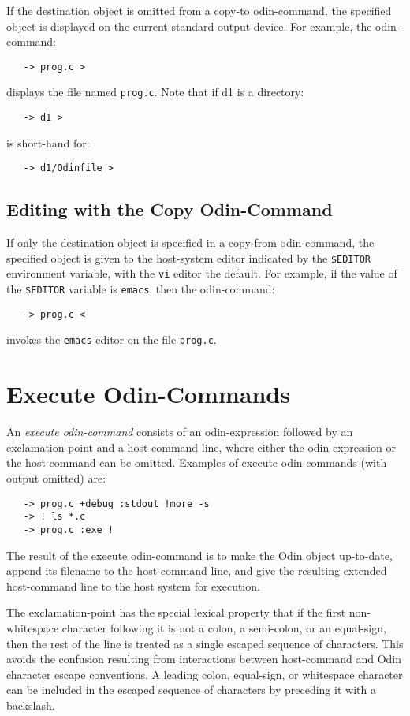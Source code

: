 \documentclass[hidelinks]{report}
\newcommand{\ex}{\tt}   %
\begin{document}
If the destination object is omitted from a copy-to odin-command,
the specified object is displayed on the current standard output device.
For example, the odin-command:
\begin{verbatim}
   -> prog.c >
\end{verbatim}
displays the file named {\ex prog.c}. Note that if d1 is a directory:
\begin{verbatim}
   -> d1 >
\end{verbatim}
is short-hand for:
\begin{verbatim}
   -> d1/Odinfile >
\end{verbatim}

\subsection{Editing with the Copy Odin-Command}

If only the destination object is specified in a copy-from odin-command,
the specified object is given to the host-system editor
indicated by the {\ex \$EDITOR} environment variable,
with the {\ex vi} editor the default.
For example, if the value of the {\ex \$EDITOR} variable is {\ex emacs},
then the odin-command:
\begin{verbatim}
   -> prog.c <
\end{verbatim}
invokes the {\ex emacs} editor on the file {\ex prog.c}.


\section{Execute Odin-Commands}
\label{execute}

An {\em execute odin-command} consists of an odin-expression followed by
an exclamation-point and a host-command line,
where either the odin-expression or the host-command can be omitted.
Examples of execute odin-commands (with output omitted) are:
\begin{verbatim}
   -> prog.c +debug :stdout !more -s
   -> ! ls *.c
   -> prog.c :exe !
\end{verbatim}
The result of the execute odin-command is to make the Odin object up-to-date,
append its filename to the host-command line,
and give the resulting extended host-command line
to the host system for execution.

The exclamation-point has the special lexical property that if the
first non-whitespace character following it
is not a colon, a semi-colon, or an equal-sign,
then the rest of the line is treated as a single escaped sequence of
characters.
This avoids the confusion resulting from interactions between host-command
and Odin character escape conventions.
A leading colon, equal-sign, or whitespace character can be
included in the escaped sequence of characters by preceding it
with a backslash.
\end{document}
